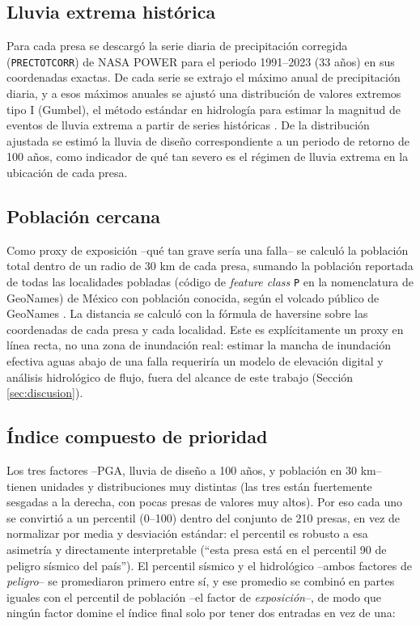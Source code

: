 \subsection{Lluvia extrema hist\'orica}
\label{sec:metodologia_lluvia}

Para cada presa se descarg\'o la serie diaria de precipitaci\'on corregida (\texttt{PRECTOTCORR}) de NASA POWER \cite{nasapower2026} para el periodo 1991--2023 (33 a\~nos) en sus coordenadas exactas. De cada serie se extrajo el m\'aximo anual de precipitaci\'on diaria, y a esos m\'aximos anuales se ajust\'o una distribuci\'on de valores extremos tipo I (Gumbel), el m\'etodo est\'andar en hidrolog\'ia para estimar la magnitud de eventos de lluvia extrema a partir de series hist\'oricas \cite{chow1988applied}. De la distribuci\'on ajustada se estim\'o la lluvia de dise\~no correspondiente a un periodo de retorno de 100 a\~nos, como indicador de qu\'e tan severo es el r\'egimen de lluvia extrema en la ubicaci\'on de cada presa.

\subsection{Poblaci\'on cercana}
\label{sec:metodologia_poblacion}

Como proxy de exposici\'on --qu\'e tan grave ser\'ia una falla-- se calcul\'o la poblaci\'on total dentro de un radio de 30 km de cada presa, sumando la poblaci\'on reportada de todas las localidades pobladas (c\'odigo de \emph{feature class} \texttt{P} en la nomenclatura de GeoNames) de M\'exico con poblaci\'on conocida, seg\'un el volcado p\'ublico de GeoNames \cite{geonames2026}. La distancia se calcul\'o con la f\'ormula de haversine sobre las coordenadas de cada presa y cada localidad. Este es expl\'icitamente un proxy en l\'inea recta, no una zona de inundaci\'on real: estimar la mancha de inundaci\'on efectiva aguas abajo de una falla requerir\'ia un modelo de elevaci\'on digital y an\'alisis hidrol\'ogico de flujo, fuera del alcance de este trabajo (Secci\'on \ref{sec:discusion}).

\subsection{\'Indice compuesto de prioridad}
\label{sec:metodologia_indice}

Los tres factores --PGA, lluvia de dise\~no a 100 a\~nos, y poblaci\'on en 30 km-- tienen unidades y distribuciones muy distintas (las tres est\'an fuertemente sesgadas a la derecha, con pocas presas de valores muy altos). Por eso cada uno se convirti\'o a un percentil (0--100) dentro del conjunto de 210 presas, en vez de normalizar por media y desviaci\'on est\'andar: el percentil es robusto a esa asimetr\'ia y directamente interpretable (``esta presa est\'a en el percentil 90 de peligro s\'ismico del pa\'is''). El percentil s\'ismico y el hidrol\'ogico --ambos factores de \emph{peligro}-- se promediaron primero entre s\'i, y ese promedio se combin\'o en partes iguales con el percentil de poblaci\'on --el factor de \emph{exposici\'on}--, de modo que ning\'un factor domine el \'indice final solo por tener dos entradas en vez de una:

